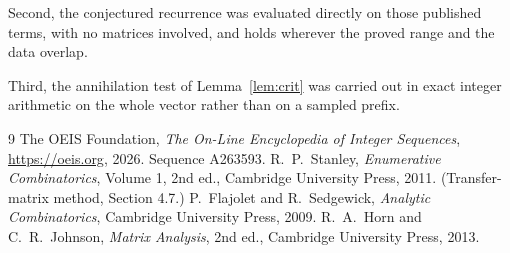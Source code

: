 \documentclass[11pt,a4paper]{article}
\theoremstyle{plain}
\theoremstyle{definition}
\begin{document}
Second, the conjectured recurrence was evaluated directly on those published terms, with no
matrices involved, and holds wherever the proved range and the data overlap.

Third, the annihilation test of Lemma~\ref{lem:crit} was carried out in exact integer
arithmetic on the whole vector rather than on a sampled prefix.

\begin{thebibliography}{9}
 The OEIS Foundation, \emph{The On-Line Encyclopedia of Integer
Sequences}, \url{https://oeis.org}, 2026. Sequence A263593.
 R.~P.~Stanley, \emph{Enumerative Combinatorics}, Volume 1, 2nd ed.,
Cambridge University Press, 2011. (Transfer-matrix method, Section 4.7.)
 P.~Flajolet and R.~Sedgewick, \emph{Analytic Combinatorics}, Cambridge
University Press, 2009.
 R.~A.~Horn and C.~R.~Johnson, \emph{Matrix Analysis}, 2nd ed., Cambridge
University Press, 2013.
\end{thebibliography}
\end{document}
